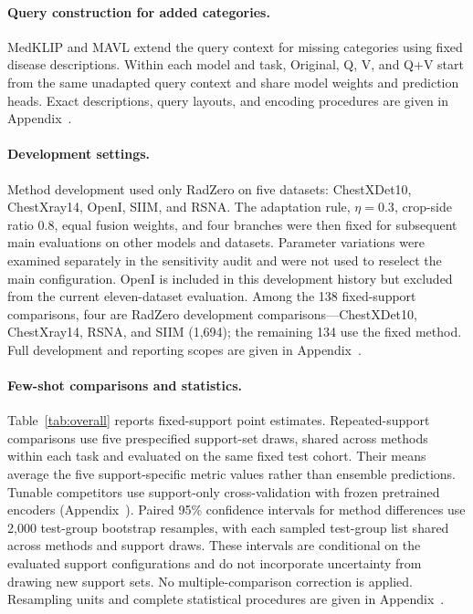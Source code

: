 \documentclass[10pt,twocolumn,letterpaper]{article}
\begin{document}
\paragraph{Query construction for added categories.}
MedKLIP and MAVL extend the query context for missing categories using fixed disease descriptions. Within each model and task, Original, Q, V, and Q+V start from the same unadapted query context and share model weights and prediction heads. Exact descriptions, query layouts, and encoding procedures are given in Appendix~.

\paragraph{Development settings.}
Method development used only RadZero on five datasets: ChestXDet10, ChestXray14, OpenI, SIIM, and RSNA. The adaptation rule, $\eta=0.3$, crop-side ratio 0.8, equal fusion weights, and four branches were then fixed for subsequent main evaluations on other models and datasets. Parameter variations were examined separately in the sensitivity audit and were not used to reselect the main configuration. OpenI is included in this development history but excluded from the current eleven-dataset evaluation. Among the 138 fixed-support comparisons, four are RadZero development comparisons---ChestXDet10, ChestXray14, RSNA, and SIIM (1,694); the remaining 134 use the fixed method. Full development and reporting scopes are given in Appendix~.

\paragraph{Few-shot comparisons and statistics.}
Table~\ref{tab:overall} reports fixed-support point estimates. Repeated-support comparisons use five prespecified support-set draws, shared across methods within each task and evaluated on the same fixed test cohort. Their means average the five support-specific metric values rather than ensemble predictions. Tunable competitors use support-only cross-validation with frozen pretrained encoders (Appendix~). Paired 95\% confidence intervals for method differences use 2,000 test-group bootstrap resamples, with each sampled test-group list shared across methods and support draws. These intervals are conditional on the evaluated support configurations and do not incorporate uncertainty from drawing new support sets. No multiple-comparison correction is applied. Resampling units and complete statistical procedures are given in Appendix~.
\end{document}
